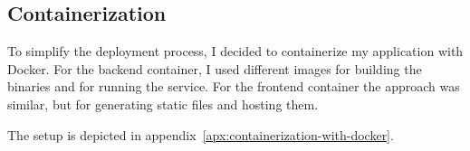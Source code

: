 \subsection{Containerization}\label{sec:containerization}

To simplify the deployment process,
I decided to containerize my application
with Docker.
For the backend container,
I used different images
for building the binaries
and for running the service.
For the frontend container the approach was similar,
but for generating static files
and hosting them.

The setup is depicted in appendix~\ref{apx:containerization-with-docker}.
